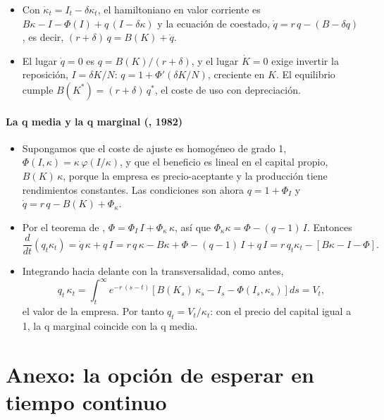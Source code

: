 \documentclass[11pt]{article}
\begin{document}
\begin{itemize}
\item Con $\dot\kappa_t=I_t-\delta\kappa_t$, el hamiltoniano en valor corriente es $B\kappa-I-\Phi({I})+q\,(I-\delta\kappa)$ y la ecuación de coestado, $\dot q=r\,q-(B-\delta q)$, es decir, $(r+\delta)\,q=B(K)+\dot q$.
\item El lugar $\dot q=0$ es $q=B(K)/(r+\delta)$, y el lugar $\dot K=0$ exige invertir la reposición, $I=\delta K/N$: $q=1+\Phi'(\delta K/N)$, creciente en $K$. El equilibrio cumple $B(K^*)=(r+\delta)\,q^*$, el coste de uso con depreciación.
\end{itemize}

\paragraph{La q media y la q marginal (, 1982)}

\begin{itemize}
\item Supongamos que el coste de ajuste es homogéneo de grado 1, $\Phi({I},\kappa)=\kappa\,\varphi(I/\kappa)$, y que el beneficio es lineal en el capital propio, $B(K)\,\kappa$, porque la empresa es precio-aceptante y la producción tiene rendimientos constantes. Las condiciones son ahora $q=1+\Phi_I$ y $\dot q=r\,q-B(K)+\Phi_{\kappa}$.
\item Por el teorema de , $\Phi=\Phi_I\,I+\Phi_{\kappa}\,\kappa$, así que $\Phi_{\kappa}\kappa=\Phi-(q-1)\,I$. Entonces
  \begin{equation*}
  \frac{d}{dt}(q_t\kappa_t)=\dot q\,\kappa+q\,I=r\,q\,\kappa-B\kappa+\Phi-(q-1)\,I+q\,I=r\,q_t\kappa_t-\left[B\kappa-I-\Phi\right].
  \end{equation*}
\item Integrando hacia delante con la transversalidad, como antes,
  \begin{equation*}
  q_t\,\kappa_t=\int_t^{\infty}e^{-r\,(s-t)}\left[B(K_s)\,\kappa_s-I_s-\Phi(I_s,\kappa_s)\right]ds=V_t,
  \end{equation*}
  el valor de la empresa. Por tanto $q_t=V_t/\kappa_t$: con el precio del capital igual a 1, la q marginal coincide con la q media. \findemo
\end{itemize}

\section{Anexo: la opción de esperar en tiempo continuo}\label{anexo:opcion-continua}
\end{document}

